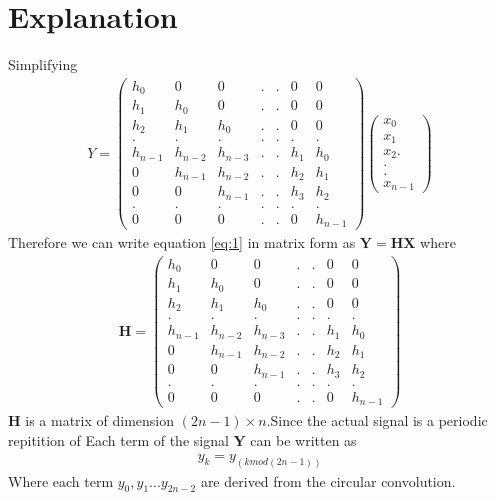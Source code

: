\documentclass[journal,12pt,twocolumn]{IEEEtran}
\providecommand{\brak}[1]{\ensuremath{\left(#1\right)}}
\newcommand{\myvec}[1]{\ensuremath{\begin{pmatrix}#1\end{pmatrix}}}
\numberwithin{equation}{subsection}
\let\vec\mathbf
\begin{document}
\section{Explanation}
Simplifying
\begin{align}
    Y=\myvec{h_0&0&0&.&.&0&0\\h_1&h_0&0&.&.&0&0\\h_2&h_1&h_0&.&.&0&0\\.&.&.&.&.&.&.\\h_{n-1}&h_{n-2}&h_{n-3}&.&.&h_1&h_0\\0&h_{n-1}&h_{n-2}&.&.&h_2&h_1\\0&0&h_{n-1}&.&.&h_3&h_2\\.&.&.&.&.&.&.\\0&0&0&.&.&0&h_{n-1}}\myvec{x_0\\x_1\\x_2.\\.\\.\\x_{n-1}}
\end{align}
Therefore we can write equation \eqref{eq:1} in matrix form as $\vec{Y}=\vec{H}\vec{X}$ where
\begin{align}
    \vec{H}=\myvec{h_0&0&0&.&.&0&0\\h_1&h_0&0&.&.&0&0\\h_2&h_1&h_0&.&.&0&0\\.&.&.&.&.&.&.\\h_{n-1}&h_{n-2}&h_{n-3}&.&.&h_1&h_0\\0&h_{n-1}&h_{n-2}&.&.&h_2&h_1\\0&0&h_{n-1}&.&.&h_3&h_2\\.&.&.&.&.&.&.\\0&0&0&.&.&0&h_{n-1}}
\end{align}
$\vec{H}$ is a matrix of dimension $(2n-1)\times n$.Since the actual signal is a periodic repitition of Each term of the signal $\vec{Y}$ can be written as
\begin{align}
    y_k=y_\brak{kmod(2n-1)}
\end{align}
Where each term $y_0,y_1...y_{2n-2}$ are derived from the circular convolution.
\end{document}
